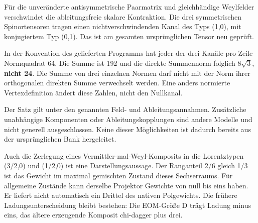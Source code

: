 Für die unveränderte antisymmetrische Paarmatrix und gleichhändige
Weylfelder verschwindet die ableitungsfreie skalare Kontraktion. Die
drei symmetrischen Spinortensoren tragen einen nichtverschwindenden
Kanal des Typs (1,0), mit konjugiertem Typ (0,1). Das ist am gesamten
ursprünglichen Tensor neu geprüft.

In der Konvention des gelieferten Programms hat jeder der drei Kanäle
pro Zeile Normquadrat 64. Die Summe ist 192 und die direkte Summennorm
folglich \(8\sqrt3\), \textbf{nicht 24}. Die Summe von drei einzelnen
Normen darf nicht mit der Norm ihrer orthogonalen direkten Summe
verwechselt werden. Eine anders normierte Vertexdefinition ändert diese
Zahlen, nicht den Nullkanal.

Der Satz gilt unter den genannten Feld- und Ableitungsannahmen.
Zusätzliche unabhängige Komponenten oder Ableitungskopplungen sind
andere Modelle und nicht generell ausgeschlossen. Keine dieser
Möglichkeiten ist dadurch bereits aus der ursprünglichen Bank
hergeleitet.

Auch die Zerlegung eines Vermittler-mal-Weyl-Komposits in die
Lorentztypen (3/2,0) und (1/2,0) ist eine Darstellungsaussage. Der
Ranganteil 2/6 gleich 1/3 ist das Gewicht im maximal gemischten Zustand
dieses Sechserraums. Für allgemeine Zustände kann derselbe Projektor
Gewichte von null bis eins haben. Er liefert nicht automatisch ein
Drittel des nativen Polgewichts. Die frühere Ladungsunterscheidung
bleibt bestehen: Die EOM-Größe D trägt Ladung minus eins, das ältere
erzeugende Komposit chi-dagger plus drei.


